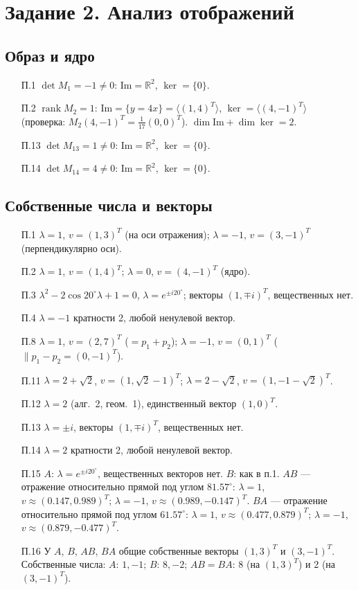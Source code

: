 \documentclass[a4paper, 12pt]{article}
\DeclareMathOperator{\rank}{rank}
\begin{document}
    \section{Задание 2. Анализ отображений}
    \subsection{Образ и ядро}
    \begin{itemize}
        \item[П.1] $\det M_1=-1\neq0$: $\mathrm{Im}=\mathbb R^2$, $\ker=\{0\}$.
        \item[П.2] $\rank M_2=1$: $\mathrm{Im}=\{y=4x\}=\langle(1,4)^T\rangle$, $\ker=\langle(4,-1)^T\rangle$ (проверка: $M_2(4,-1)^T=\frac1{17}(0,0)^T$). $\dim\mathrm{Im}+\dim\ker=2$.
        \item[П.13] $\det M_{13}=1\neq0$: $\mathrm{Im}=\mathbb R^2$, $\ker=\{0\}$.
        \item[П.14] $\det M_{14}=4\neq0$: $\mathrm{Im}=\mathbb R^2$, $\ker=\{0\}$.
    \end{itemize}

    \subsection{Собственные числа и векторы}
    \begin{itemize}
        \item[П.1] $\lambda=1$, $v=(1,3)^T$ (на оси отражения); $\lambda=-1$, $v=(3,-1)^T$ (перпендикулярно оси).
        \item[П.2] $\lambda=1$, $v=(1,4)^T$; $\lambda=0$, $v=(4,-1)^T$ (ядро).
        \item[П.3] $\lambda^2-2\cos20^\circ\lambda+1=0$, $\lambda=e^{\pm i20^\circ}$; векторы $(1,\mp i)^T$, вещественных нет.
        \item[П.4] $\lambda=-1$ кратности 2, любой ненулевой вектор.
        \item[П.8] $\lambda=1$, $v=(2,7)^T$ ($=p_1+p_2$); $\lambda=-1$, $v=(0,1)^T$ ($\parallel p_1-p_2=(0,-1)^T$).
        \item[П.11] $\lambda=2+\sqrt2$, $v=(1,\sqrt2-1)^T$; $\lambda=2-\sqrt2$, $v=(1,-1-\sqrt2)^T$.
        \item[П.12] $\lambda=2$ (алг.\ 2, геом.\ 1), единственный вектор $(1,0)^T$.
        \item[П.13] $\lambda=\pm i$, векторы $(1,\mp i)^T$, вещественных нет.
        \item[П.14] $\lambda=2$ кратности 2, любой ненулевой вектор.
        \item[П.15] $A$: $\lambda=e^{\pm i20^\circ}$, вещественных векторов нет. $B$: как в п.1. $AB$ --- отражение относительно прямой под углом $81.57^\circ$: $\lambda=1$, $v\approx(0.147,0.989)^T$; $\lambda=-1$, $v\approx(0.989,-0.147)^T$. $BA$ --- отражение относительно прямой под углом $61.57^\circ$: $\lambda=1$, $v\approx(0.477,0.879)^T$; $\lambda=-1$, $v\approx(0.879,-0.477)^T$.
        \item[П.16] У $A$, $B$, $AB$, $BA$ общие собственные векторы $(1,3)^T$ и $(3,-1)^T$. Собственные числа: $A$: $1,-1$; $B$: $8,-2$; $AB=BA$: $8$ (на $(1,3)^T$) и $2$ (на $(3,-1)^T$).
    \end{itemize}
\end{document}
